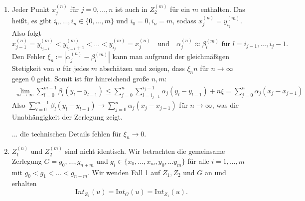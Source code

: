 \documentclass[a4paper,fontsize=8pt,DIV=1]{article}
\theoremstyle{plain}
\begin{document}
\begin{enumerate}
	\item Jeder Punkt $x_j^{(n)}$ für $j=0,...,n$ ist auch in $Z_2^{(m)}$ für ein $m$ enthalten. Das heißt, es gibt $i_0,...,i_n \in \{0,...,m\}$ und $i_0 = 0, i_n = m$, sodass $x_j^{(n)} = y_{i_j}^{(m)}$. Also folgt
	\[
		x_{j-1}^{(n)} = y_{i_{j-1}}^{(m)} < y_{i_{j-1} + 1}^{(m)} <...< y_{i_{j}}^{(m)} = x_{j}^{(n)} \quad \text{und} \quad \alpha_j ^{(n)}\approx \beta_l^{(m)} \text{ für } l = i_{j-1},...,i_j-1.
	\]
	Den Fehler $\xi_n \coloneqq |\alpha_j^{(n)} - \beta_l^{(m)}|$ kann man aufgrund der gleichmäßigen Stetigkeit von $u$ für jedes $m$ abschätzen und zeigen, dass $\xi_n n$ für $n \to \infty$ gegen $0$ geht. Somit ist für hinreichend große $n,m$: 
	\begin{align*}
		\lim_{m \to \infty} \sum_{l=0}^{m-1} \beta_l (y_l - y_{l-1}) \leq \sum_{j=0}^{n} \sum_{l = i_{j-1}}^{i_{j}-1} \alpha_j(y_l-y_{l-1}) + n\xi = \sum_{j=0}^n \alpha_j(x_j-x_{j-1})
	\end{align*}
	Also $\sum_{l=0}^{m-1} \beta_l (y_l - y_{l-1}) \to  \sum_{j=0}^n \alpha_j(x_j-x_{j-1})$ für $n \to \infty$, was die Unabhängigkeit der Zerlegung zeigt.
	
	... die technischen Details fehlen für $\xi_n \to 0$. 
 
	\item $Z_1^{(n)}$ und $Z_2^{(m)}$ sind nicht identisch. Wir betrachten die gemeinsame Zerlegung $G = g_0,...,g_{n+m}$ und $g_i \in \{ x_0,...,x_m,y_0,...y_m \}$ für alle $i=1,...,m$ mit $g_0 < g_1 < ... < g_{n+m}$. Wir wenden Fall 1 auf $Z_1, Z_2$ und $G$ an und erhalten
	\[
		\mathrm Int_{Z_1}(u) = \mathrm Int_{G}(u) = \mathrm Int_{Z_1}(u).
	\]
\end{enumerate}


	
\end{document}

